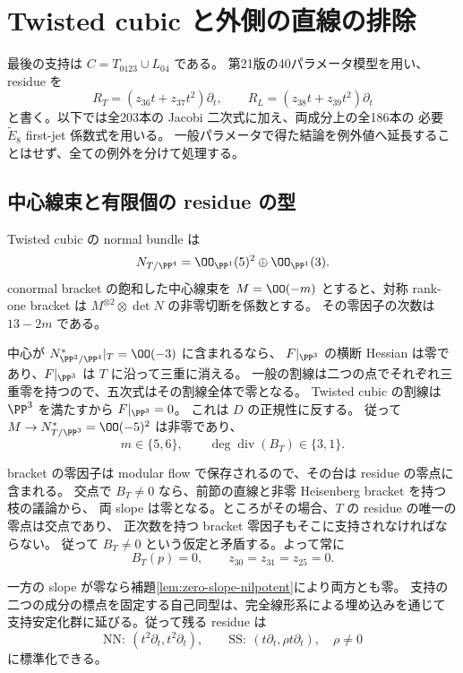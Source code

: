 \section{Twisted cubic と外側の直線の排除}\label{sec:31}

最後の支持は $C=T_{0123}\cup L_{04}$ である。
第21版の40パラメータ模型を用い、residue を
\[
 R_T=(z_{36}t+z_{37}t^2)\partial_t,\qquad
 R_L=(z_{38}t+z_{39}t^2)\partial_t
\]
と書く。以下では全203本の Jacobi 二次式に加え、両成分上の全186本の
必要 $\widetilde E_8$ first-jet 係数式を用いる。
一般パラメータで得た結論を例外値へ延長することはせず、全ての例外を分けて処理する。

\subsection{中心線束と有限個の residue の型}
Twisted cubic の normal bundle は
\[
 N_{T/\PP^4}=\OO_{\PP^1}(5)^2\oplus\OO_{\PP^1}(3).
\]
conormal bracket の飽和した中心線束を $M=\OO(-m)$ とすると、対称 rank-one bracket は
$M^{\otimes2}\otimes\det N$ の非零切断を係数とする。
その零因子の次数は $13-2m$ である。

中心が $N^*_{\PP^3/\PP^4}|_T=\OO(-3)$ に含まれるなら、
$F|_{\PP^3}$ の横断 Hessian は零であり、$F|_{\PP^3}$ は $T$ に沿って三重に消える。
一般の割線は二つの点でそれぞれ三重零を持つので、五次式はその割線全体で零となる。
Twisted cubic の割線は $\PP^3$ を満たすから $F|_{\PP^3}=0$。
これは $D$ の正規性に反する。
従って $M\to N^*_{T/\PP^3}=\OO(-5)^2$ は非零であり、
\begin{equation}\label{eq:tc-center-degrees}
 m\in\{5,6\},\qquad \deg\operatorname{div}(B_T)\in\{3,1\}.
\end{equation}

bracket の零因子は modular flow で保存されるので、その台は residue の零点に含まれる。
交点で $B_T\ne0$ なら、前節の直線と非零 Heisenberg bracket を持つ枝の議論から、
両 slope は零となる。ところがその場合、$T$ の residue の唯一の零点は交点であり、
正次数を持つ bracket 零因子もそこに支持されなければならない。
従って $B_T\ne0$ という仮定と矛盾する。よって常に
\[
 B_T(p)=0,\qquad z_{30}=z_{31}=z_{25}=0.
\]

一方の slope が零なら補題\ref{lem:zero-slope-nilpotent}により両方とも零。
支持の二つの成分の標点を固定する自己同型は、完全線形系による埋め込みを通じて
支持安定化群に延びる。従って残る residue は
\[
 \mathrm{NN}:\ (t^2\partial_t,t^2\partial_t),\qquad
 \mathrm{SS}:\ (t\partial_t,\rho t\partial_t),\quad\rho\ne0
\]
に標準化できる。

